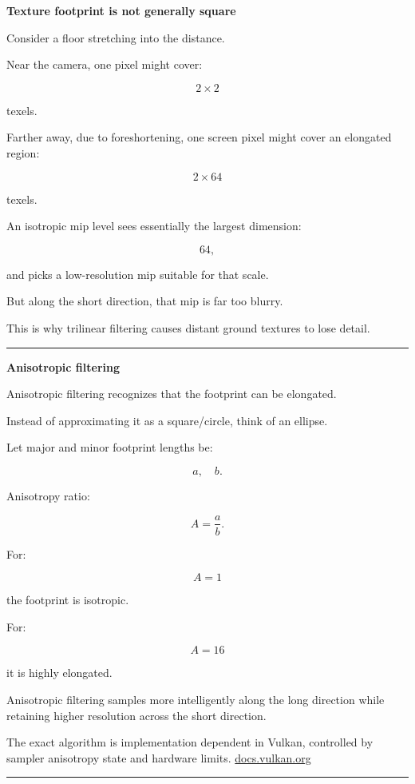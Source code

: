 \textbf{Texture footprint is not generally square}

Consider a floor stretching into the distance.

Near the camera, one pixel might cover:

\[
2\times2
\]

texels.

Farther away, due to foreshortening, one screen pixel might cover an elongated region:

\[
2\times64
\]

texels.

An isotropic mip level sees essentially the largest dimension:

\[
64,
\]

and picks a low-resolution mip suitable for that scale.

But along the short direction, that mip is far too blurry.

This is why trilinear filtering causes distant ground textures to lose detail.

\begin{center}\rule{0.5\linewidth}{0.5pt}\end{center}

\textbf{Anisotropic filtering}

Anisotropic filtering recognizes that the footprint can be elongated.

Instead of approximating it as a square/circle, think of an ellipse.

Let major and minor footprint lengths be:

\[
a,\quad b.
\]

Anisotropy ratio:

\[
\boxed{
A=\frac{a}{b}.
}
\]

For:

\[
A=1
\]

the footprint is isotropic.

For:

\[
A=16
\]

it is highly elongated.

Anisotropic filtering samples more intelligently along the long direction while retaining higher resolution across the short direction.

The exact algorithm is implementation dependent in Vulkan, controlled by sampler anisotropy state and hardware limits. \href{https://docs.vulkan.org/spec/latest/chapters/textures.html?utm_source=chatgpt.com}{docs.vulkan.org}

\begin{center}\rule{0.5\linewidth}{0.5pt}\end{center}

